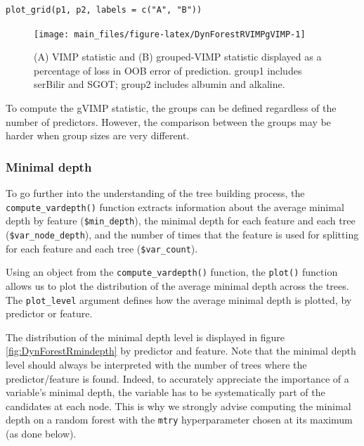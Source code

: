 \begin{verbatim}
plot_grid(p1, p2, labels = c("A", "B"))
\end{verbatim}

\begin{figure}

{\centering \texttt{[image: main\_files/figure-latex/DynForestRVIMPgVIMP-1]}

}

\caption{(A) VIMP statistic and (B) grouped-VIMP statistic displayed as a percentage of loss in OOB error of prediction. group1 includes serBilir and SGOT; group2 includes albumin and alkaline.}\label{fig:DynForestRVIMPgVIMP}
\end{figure}

To compute the gVIMP statistic, the groups can be defined regardless of the number of predictors. However, the comparison between the groups may be harder when group sizes are very different.

\subsubsection{Minimal depth}\label{minimal-depth-1}

To go further into the understanding of the tree building process, the \texttt{compute\_vardepth()} function extracts information about the average minimal depth by feature (\texttt{\$min\_depth}), the minimal depth for each feature and each tree (\texttt{\$var\_node\_depth}), and the number of times that the feature is used for splitting for each feature and each tree (\texttt{\$var\_count}).

Using an object from the \texttt{compute\_vardepth()} function, the \texttt{plot()} function allows us to plot the distribution of the average minimal depth across the trees. The \texttt{plot\_level} argument defines how the average minimal depth is plotted, by predictor or feature.

The distribution of the minimal depth level is displayed in figure \ref{fig:DynForestRmindepth} by predictor and feature. Note that the minimal depth level should always be interpreted with the number of trees where the predictor/feature is found. Indeed, to accurately appreciate the importance of a variable's minimal depth, the variable has to be systematically part of the candidates at each node. This is why we strongly advise computing the minimal depth on a random forest with the \texttt{mtry} hyperparameter chosen at its maximum (as done below).

